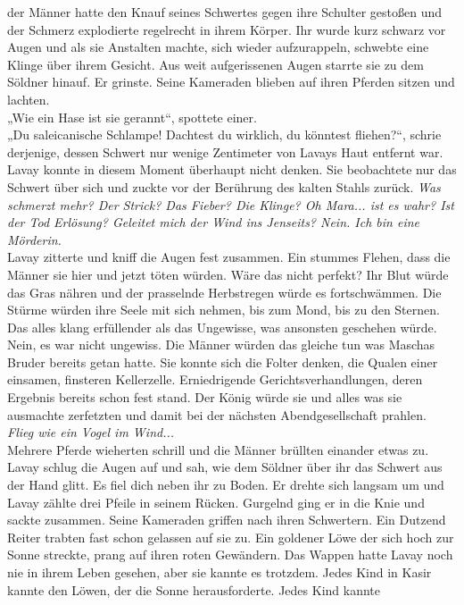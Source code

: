 der Männer hatte den Knauf seines Schwertes gegen ihre Schulter gestoßen und der Schmerz 
explodierte regelrecht in ihrem Körper. Ihr wurde kurz schwarz vor Augen und als sie Anstalten 
machte, sich wieder aufzurappeln, schwebte eine Klinge über ihrem Gesicht. Aus weit aufgerissenen 
Augen starrte sie zu dem Söldner hinauf. Er grinste. Seine Kameraden blieben auf ihren Pferden 
sitzen und lachten.\\
„Wie ein Hase ist sie gerannt“, spottete einer. \\
„Du saleicanische Schlampe! Dachtest du wirklich, du könntest fliehen?“, schrie derjenige, dessen 
Schwert nur wenige Zentimeter von Lavays Haut entfernt war.\\
Lavay konnte in diesem Moment überhaupt nicht denken. Sie beobachtete nur das Schwert über sich und 
zuckte vor der Berührung des kalten Stahls zurück. \textit{Was schmerzt mehr? Der Strick? Das 
Fieber? Die Klinge? Oh Mara... ist es wahr? Ist der Tod Erlösung? Geleitet mich der Wind ins 
Jenseits? Nein. Ich bin eine Mörderin.}\\
Lavay zitterte und kniff die Augen fest zusammen. Ein stummes Flehen, dass die Männer sie hier und 
jetzt töten würden. Wäre das nicht perfekt? Ihr Blut würde das Gras nähren und der prasselnde 
Herbstregen würde es fortschwämmen. Die Stürme würden ihre Seele mit sich nehmen, bis zum Mond, bis 
zu den Sternen. Das alles klang erfüllender als das Ungewisse, was ansonsten geschehen würde. Nein, 
es war nicht ungewiss. Die Männer würden das gleiche tun was Maschas Bruder bereits getan hatte. Sie 
konnte sich die Folter denken, die Qualen einer einsamen, finsteren Kellerzelle. Erniedrigende 
Gerichtsverhandlungen, deren Ergebnis bereits schon fest stand. Der König würde sie und alles was 
sie ausmachte zerfetzten und damit bei der nächsten Abendgesellschaft prahlen.\\
\textit{Flieg wie ein Vogel im Wind...}\\
Mehrere Pferde wieherten schrill und die Männer brüllten einander etwas zu. Lavay schlug die Augen 
 auf und sah, wie dem Söldner über ihr das Schwert aus der Hand glitt. Es fiel dich neben ihr zu 
Boden. Er drehte sich langsam um und Lavay zählte drei Pfeile in seinem Rücken. Gurgelnd ging er in 
die Knie und sackte zusammen. Seine Kameraden griffen nach ihren Schwertern. Ein Dutzend Reiter 
trabten fast schon gelassen auf sie zu. Ein goldener Löwe der sich hoch zur Sonne streckte, prang 
auf ihren roten Gewändern. Das Wappen hatte Lavay noch nie in ihrem Leben gesehen, aber sie kannte 
es trotzdem. Jedes Kind in Kasir kannte den Löwen, der die Sonne herausforderte. Jedes Kind kannte 
